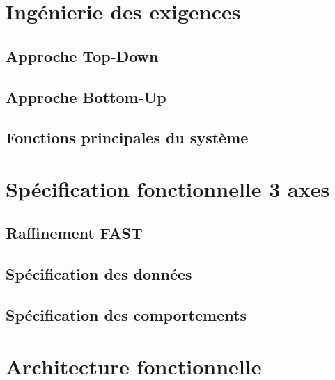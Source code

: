 \chapter{Ingénierie des exigences}
\section{Approche Top-Down}


\section{Approche Bottom-Up}

\section{Fonctions principales du système}

\chapter{Spécification fonctionnelle  3 axes}

\section{Raffinement FAST}
\section{Spécification des données}
\section{Spécification des comportements}


\chapter{Architecture fonctionnelle}


